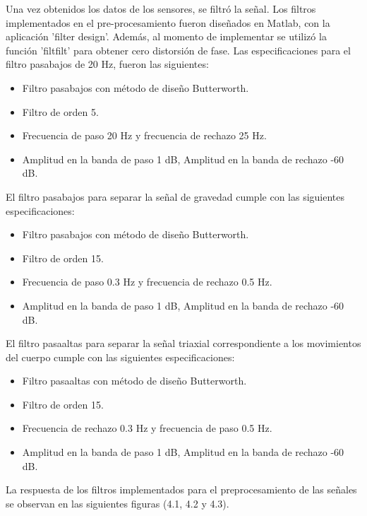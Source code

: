 \documentclass[11pt]{report}
\begin{document}
\par
\medskip
\noindent
Una vez obtenidos los datos de los sensores, se filtró la señal. Los filtros implementados en el pre-procesamiento fueron diseñados en Matlab, con la aplicación 'filter design'. Además, al momento de implementar se utilizó la función 'filtfilt' para obtener cero distorsión de fase. Las especificaciones para el filtro pasabajos de 20 Hz, fueron las siguientes:

\begin{itemize}
\item Filtro pasabajos con método de diseño Butterworth.
\item Filtro de orden 5.
\item Frecuencia de paso 20 Hz y frecuencia de rechazo 25 Hz.
\item Amplitud en la banda de paso 1 dB, Amplitud en la banda de rechazo -60 dB.
\end{itemize}

\par
\medskip
\noindent
El filtro pasabajos para separar la señal de gravedad cumple con las siguientes especificaciones:

\begin{itemize}
\item Filtro pasabajos con método de diseño Butterworth.
\item Filtro de orden 15.
\item Frecuencia de paso 0.3 Hz y frecuencia de rechazo 0.5 Hz.
\item Amplitud en la banda de paso 1 dB, Amplitud en la banda de rechazo -60 dB.
\end{itemize}

\par
\medskip
\noindent
El filtro pasaaltas para separar la señal triaxial correspondiente a los movimientos del cuerpo cumple con las siguientes especificaciones:

\begin{itemize}
\item Filtro pasaaltas con método de diseño Butterworth.
\item Filtro de orden 15.
\item Frecuencia de rechazo 0.3 Hz y frecuencia de paso 0.5 Hz.
\item Amplitud en la banda de paso 1 dB, Amplitud en la banda de rechazo -60 dB.
\end{itemize}

\par
\medskip
\noindent
 La respuesta de los filtros implementados para el preprocesamiento de las señales se observan en las siguientes figuras (4.1, 4.2 y 4.3).
\end{document}
